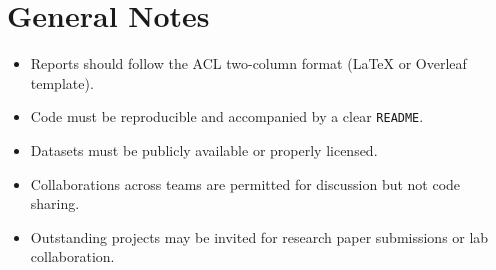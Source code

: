\documentclass[12pt]{article}
\begin{document}

\section*{General Notes}
\begin{itemize}[leftmargin=*]
  \item Reports should follow the ACL two-column format (LaTeX or Overleaf template).
  \item Code must be reproducible and accompanied by a clear \texttt{README}.
  \item Datasets must be publicly available or properly licensed.
  \item Collaborations across teams are permitted for discussion but not code sharing.
  \item Outstanding projects may be invited for research paper submissions or lab collaboration.
\end{itemize}
\end{document}
